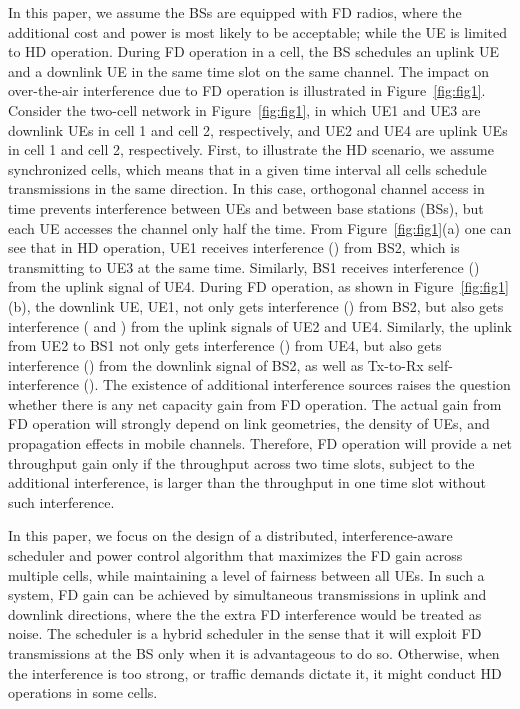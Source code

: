 \documentclass[journal]{IEEEtran}
\begin{document}
In this paper, we assume the BSs are equipped with FD radios, where the additional cost and power is most likely to be acceptable; while the UE is limited to HD operation. During FD operation in a cell, the BS schedules an uplink UE and a downlink UE in the same time slot on the same channel. The impact on over-the-air interference due to FD operation is illustrated in Figure~\ref{fig:fig1}. Consider the two-cell network in Figure~\ref{fig:fig1}, in which UE1 and UE3 are downlink UEs in cell 1 and cell 2, respectively, and UE2 and UE4 are uplink UEs in cell 1 and cell 2, respectively. First, to illustrate the HD scenario, we assume synchronized cells, which means that in a given time interval all cells schedule transmissions in the same direction. In this case, orthogonal channel access in time prevents interference between UEs and between base stations (BSs), but each UE accesses the channel only half the time. From Figure~\ref{fig:fig1}(a) one can see that in HD operation, UE1 receives interference () from BS2, which is transmitting to UE3 at the same time. Similarly, BS1 receives interference () from the uplink signal of UE4. During FD operation, as shown in Figure~\ref{fig:fig1}(b), the downlink UE, UE1, not only gets interference () from BS2, but also gets interference ( and ) from the uplink signals of UE2 and UE4. Similarly, the uplink from UE2 to BS1 not only gets interference () from UE4, but also gets interference () from the downlink signal of BS2, as well as Tx-to-Rx self-interference (). The existence of additional interference sources raises the question whether there is any net capacity gain from FD operation. The actual gain from FD operation will strongly depend on link geometries, the density of UEs, and propagation effects in mobile channels. Therefore, FD operation will provide a net throughput gain only if the throughput across two time slots, subject to the additional interference, is larger than the throughput in one time slot without such interference.

In this paper, we focus on the design of a distributed, interference-aware scheduler and power control algorithm that maximizes the FD gain across multiple cells, while maintaining a level of fairness between all UEs.  In such a system, FD gain can be achieved by simultaneous transmissions in uplink and downlink directions, where the the extra FD interference would be treated as noise. The scheduler is a hybrid scheduler in the sense that it will exploit FD transmissions at the BS only when it is advantageous to do so. Otherwise, when the interference is too strong, or traffic demands dictate it, it might conduct HD operations in some cells.
\end{document}
